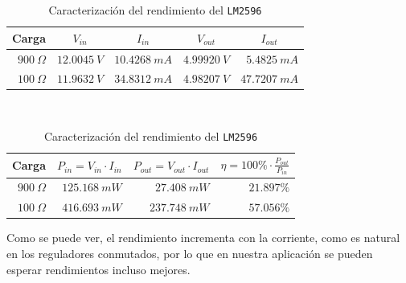 \begin{table}[H]
    \centering
    \begin{subtable}[t]{\textwidth}
        \centering
        \begin{tabular}{rrrrr}
            \toprule
            \multicolumn{1}{c}{Carga} & \multicolumn{1}{c}{$V_{in}$} & \multicolumn{1}{c}{$I_{in}$} & \multicolumn{1}{c}{$V_{out}$} & \multicolumn{1}{c}{$I_{out}$}\\ \midrule
            $900\ \Omega$             & $12.0045\ V$                 & $10.4268\ mA$                & $4.99920\ V$                  & $5.4825\ mA$                \\
            $100\ \Omega$             & $11.9632\ V$                 & $34.8312\ mA$                & $4.98207\ V$                  & $47.7207\ mA$                \\ \bottomrule
        \end{tabular}
        \caption{Medidas tomadas en laboratorio}
    \end{subtable}
    \\[0.5cm]
    \begin{subtable}[t]{\textwidth}
        \centering
        \begin{tabular}{rrrr}
            \toprule
            \multicolumn{1}{c}{Carga} & \multicolumn{1}{l}{$P_{in} = V_{in}\cdot I_{in}$} & \multicolumn{1}{l}{$P_{out} = V_{out}\cdot I_{out}$} & \multicolumn{1}{l}{$\eta = 100\%\cdot\frac{P_{out}}{P_{in}}$} \\ \midrule
            $900\ \Omega$             & $125. 168\ mW$                                    & $27.408\ mW$                                         & $21.897\%$                                                    \\
            $100\ \Omega$             & $416.693\ mW$                                     & $237.748\ mW$                                        & $57.056\%$                                                    \\ \bottomrule
        \end{tabular}
        \caption{Cálculos de rendimiento realizados}
    \end{subtable}
    \caption{Caracterización del rendimiento del \texttt{LM2596}}
    \label{tab:rendimiento_reductor}
\end{table}

Como se puede ver, el rendimiento incrementa con la corriente, como es natural en los reguladores conmutados, por lo que en nuestra aplicación se pueden esperar rendimientos incluso mejores.